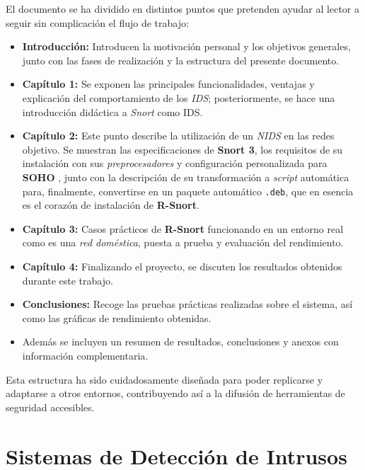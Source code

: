 \documentclass[11pt,a4paper,twoside]{report}
\newcounter{anexo}
\begin{document}
El documento se ha dividido en distintos puntos que pretenden ayudar al lector a seguir sin complicación el flujo de trabajo:

\begin{itemize}
	\item \textbf{Introducción:} Introducen la motivación personal y los objetivos generales, junto con las fases de realización y la estructura del presente documento.
	
	\item \textbf{Capítulo 1:} Se exponen las principales funcionalidades, ventajas y explicación del comportamiento de los \textit{IDS}; posteriormente, se hace una introducción didáctica a \textit{Snort} como IDS.
	
	\item \textbf{Capítulo 2:} Este punto describe la utilización de un \textit{NIDS} en las redes objetivo. Se muestran las especificaciones de \textbf{Snort 3}, los requisitos de su instalación con sus \textit{preprocesadores} y configuración personalizada para \textbf{SOHO} \cite{cocsar2017firewall}, junto con la descripción de su transformación a \textit{script} automática para, finalmente, convertirse en un paquete automático \texttt{.deb}, que en esencia es el corazón de instalación de \textbf{R-Snort}.
	
	\item \textbf{Capítulo 3:} Casos prácticos de \textbf{R-Snort} funcionando en un entorno real como es una \textit{red doméstica}, puesta a prueba y evaluación del rendimiento.
	
	\item \textbf{Capítulo 4:} Finalizando el proyecto, se discuten los resultados obtenidos durante este trabajo.
	
	\item \textbf{Conclusiones:} Recoge las pruebas prácticas realizadas sobre el sistema, así como las gráficas de rendimiento obtenidas.
	
	\item Además se incluyen un resumen de resultados, conclusiones y anexos con información complementaria.
\end{itemize}

Esta estructura ha sido cuidadosamente diseñada para poder replicarse y adaptarse a otros entornos, contribuyendo así a la difusión de herramientas de seguridad accesibles.

\setcounter{secnumdepth}{2} 

\chapter{Sistemas de Detección de Intrusos}
\end{document}
